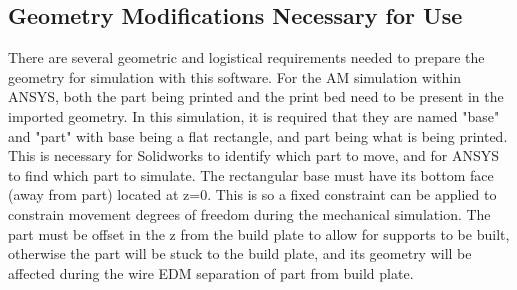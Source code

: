 \subsection{Geometry Modifications Necessary for Use}
There are several geometric and logistical requirements needed to prepare the geometry for simulation with this software.  For the AM simulation within ANSYS, both the part being printed and the print bed need to be present in the imported geometry.  In this simulation, it is required that they are named "base" and "part" with base being a flat rectangle, and part being what is being printed.  This is necessary for Solidworks to identify which part to move, and for ANSYS to find which part to simulate.  The rectangular base must have its bottom face (away from part) located at z=0.  This is so a fixed constraint can be applied to constrain movement degrees of freedom during the mechanical simulation.  The part must be offset in the z from the build plate to allow for supports to be built, otherwise the part will be stuck to the build plate, and its geometry will be affected during the wire EDM separation of part from build plate.